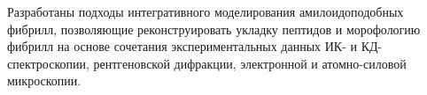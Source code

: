 Разработаны подходы интегративного моделирования амилоидоподобных фибрилл, позволяющие реконструировать укладку пептидов и морофологию фибрилл на основе сочетания экспериментальных данных ИК- и КД-спектроскопии, рентгеновской дифракции, электронной и атомно-силовой микроскопии.

  


